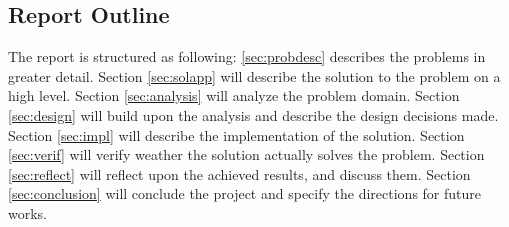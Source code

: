 \subsection{Report Outline}
The report is structured as following: \autoref{sec:probdesc} describes the problems in greater detail. Section \ref{sec:solapp} will describe the solution to the problem on a high level. Section \ref{sec:analysis} will analyze the problem domain. Section \ref{sec:design} will build upon the analysis and describe the design decisions made. Section \ref{sec:impl} will describe the implementation of the solution. Section \ref{sec:verif} will verify weather the solution actually solves the problem. Section \ref{sec:reflect} will reflect upon the achieved results, and discuss them. Section \ref{sec:conclusion} will conclude the project and specify the directions for future works.